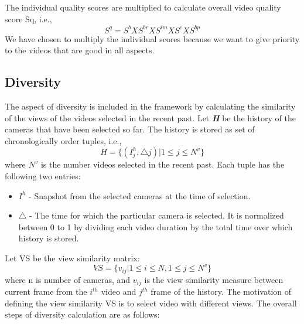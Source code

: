 \documentclass{sig-alternate}
\begin{document}
The individual quality scores are multiplied to calculate overall video quality score Sq, i.e.,
\begin{equation}
S^q = S^b X S^{br} X S^{im} X S^c X S^{bp} 
\end{equation}
We have chosen to multiply the individual scores because we want to give priority to the videos that are good in all aspects. 

\subsection{Diversity}
The aspect of diversity is included in the framework by calculating the similarity of the views of the videos selected in the recent past. Let \textit{\textbf{H}} be the history of the cameras that have been selected so far. The history is stored as set of chronologically order tuples, i.e.,
\begin{equation}
H = {\{}(I^h_j , \triangle j)|1 \leq j \leq N^v  {\}}
\end{equation}  
where \(N^v\) is the number videos selected in the recent past. Each tuple has the following two entries: 
\begin{itemize}
\item  \(I^h\) - Snapshot from the selected cameras at the time of selection. 
\item  $\triangle$ - The time for which the particular camera is selected. It is normalized between 0 to 1 by dividing each video duration by the total time over which history is stored. 
\end{itemize}
Let VS be the view similarity matrix:
\begin{equation}
VS = {\{} v_{ij}|1 \leq i \leq N, 1 \leq j \leq N^v  {\}}
\end{equation}  
where n is number of cameras, and \(v_{ij}\) is the view similarity measure between current frame from the \(i^{th}\) video and \(j^{th}\) frame of the history. The motivation of defining the view similarity VS is to select video with different views. The overall steps of diversity calculation are as follows: 
\end{document}
